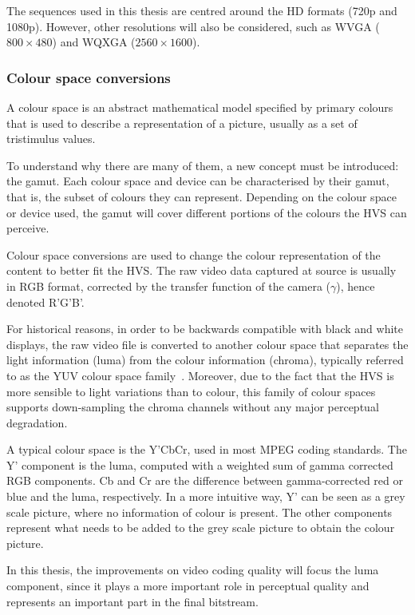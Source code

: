 \documentclass[11pt,a4paper,openright,twoside]{book}
\numberwithin{equation}{section} %
\numberwithin{figure}{section} %
\numberwithin{table}{section} %
\begin{document}
The sequences used in this thesis are centred around the \ac{HD} formats (720p
and 1080p).
However, other resolutions will also be considered, such as WVGA
($800\times480$) and WQXGA ($2560\times1600$).

\subsubsection{Colour space conversions}
\label{ssub:colour_space_conversions}

A colour space is an abstract mathematical model specified by primary colours
that is used to describe a representation of a picture, usually as a set of
tristimulus values.

To understand why there are many of them, a new concept must be introduced:
the gamut.
Each colour space and device can be characterised by their gamut, that is, the
subset of colours they can represent.
Depending on the colour space or device used, the gamut will cover different
portions of the colours the \ac{HVS} can perceive.

Colour space conversions are used to change the colour representation of the
content to better fit the \ac{HVS}.
The raw video data captured at source is usually in \ac{RGB} format, corrected
by the transfer function of the camera ($\gamma$), hence denoted R'G'B'.

For historical reasons, in order to be backwards compatible with black
and white displays, the raw video file is converted to another colour
space that separates the light information (luma) from the colour
information (chroma), typically referred to as the YUV colour space
family~\cite{poynton-95-color-space}.
Moreover, due to the fact that the \ac{HVS} is more sensible to light
variations than to colour, this family of colour spaces supports down-sampling
the chroma channels without any major perceptual degradation.

A typical colour space is the Y'CbCr, used in most MPEG coding standards.
The Y' component is the luma, computed with a weighted sum of gamma corrected
RGB components.
Cb and Cr are the difference between gamma-corrected red or blue and the luma,
respectively.
In a more intuitive way, Y' can be seen as a grey scale picture, where no
information of colour is present.
The other components represent what needs to be added to the grey scale
picture to obtain the colour picture.

In this thesis, the improvements on video coding quality will focus the luma
component, since it plays a more important role in perceptual quality and
represents an important part in the final bitstream.
\end{document}
